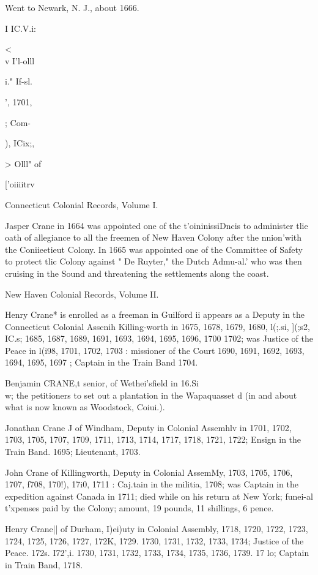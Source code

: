 \documentclass{book}
\begin{document}
Went to Newark, N. J., about 1666. 



I IC.V.i: 


<\\v I'l-olll 


i." If-sl. 


', 1701, 


; Com- 


), ICix;, 


> Olll" of 


['oiiiitrv 




Connecticut Colonial Records, Volume I. 

Jasper Crane in 1664 was appointed one of the t'oininissiDncis 
to administer tlie oath of allegiance to all the freemen of New 
Haven Colony after the nnion'with the Coniieetieut Colony. In 
1665 was appointed one of the Committee of Safety to protect tlic 
Colony against " De Ruyter," the Dutch Admu-al.' who was then 
cruising in the Sound and threatening the settlements along the 
coast. 

New Haven Colonial Records, Volume II. 

Henry Crane* is enrolled as a freeman in Guilford ii 
appears as a Deputy in the Connecticut Colonial Asscnih 
Killing-worth in 1675, 1678, 1679, 1680, l(;.si, ](;s2, IC.s; 
1685, 1687, 1689, 1691, 1693, 1694, 1695, 1696, 1700 
1702; was Justice of the Peace in l(i98, 1701, 1702, 1703 : 
missioner of the Court 1690, 1691, 1692, 1693, 1694, 1695, 
1697 ; Captain in the Train Band 1704. 

Benjamin CRANE,t senior, of Wethei'sfield in 16.Si\\ w; 
the petitioners to set out a plantation in the Wapaquasset d 
(in and about what is now known as Woodstock, Coiui.). 

Jonathan Crane J of Windham, Deputy in Colonial Assemhlv 
in 1701, 1702, 1703, 1705, 1707, 1709, 1711, 1713, 1714, 1717, 
1718, 1721, 1722; Ensign in the Train Band. 1695; Lieutenant, 
1703. 

John Crane of Killingworth, Deputy in Colonial AssemMy, 
1703, 1705, 1706, 1707, f708, 170!), 17i0, 1711 : Caj.tain in the 
militia, 1708; was Captain in the expedition against Canada in 
1711; died while on his return at New York; funei-al t'xpenses 
paid by the Colony; amount, 19 pounds, 11 shillings, 6 pence. 

Henry Crane|| of Durham, I)ei)uty in Colonial Assembly, 
1718, 1720, 1722, 1723, 1724, 1725, 1726, 1727, 172K, 1729. 
1730, 1731, 1732, 1733, 1734; Justice of the Peace. 172s. I72',i. 
1730, 1731, 1732, 1733, 1734, 1735, 1736, 1739. 17 lo; Captain 
in Train Band, 1718. 
\end{document}
